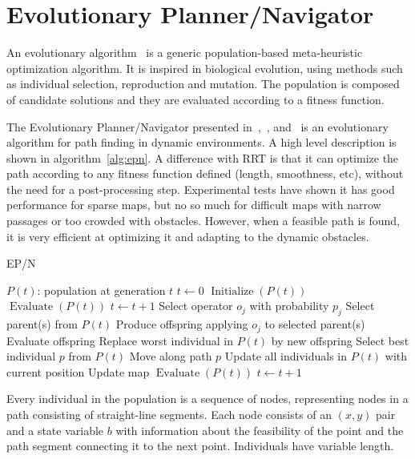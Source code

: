 \section{Evolutionary Planner/Navigator}
\label{sec:EP/N}
An evolutionary algorithm~\cite{Back97} is a generic population-based meta-heuristic
optimization algorithm. It is inspired in biological evolution, using methods
such as individual selection, reproduction and mutation. The population is
composed of candidate solutions and they are evaluated according to a fitness
function.

The Evolutionary Planner/Navigator presented in~\cite{Xiao96},~\cite{Xiao97}, and~
\cite{Trojanowski97} is an evolutionary
algorithm for path finding in dynamic environments. A high level description is
shown in algorithm~\ref{alg:epn}. A difference with RRT is
that it can optimize the path according to any fitness function
defined (length, smoothness, etc), without the need for a post-processing step.
Experimental tests have shown it has
good performance for sparse maps, but no so much for difficult maps with narrow
passages or too crowded with obstacles. However, when a feasible path is found,
it is very efficient at optimizing it and adapting to the dynamic obstacles.
\begin{algorithm}[ht!]
\caption{EP/N}
\label{alg:epn}
\begin{algorithmic}[1]
    \STATE \(P(t)\): population at generation \(t\)
    \STATE \(t \leftarrow 0\)
    \STATE \(\operatorname{Initialize}(P(t))\)
    \STATE \(\operatorname{Evaluate}(P(t))\)
        \STATE \(t \leftarrow t + 1\)
        \STATE Select operator $o_j$ with probability $p_j$
        \STATE Select parent(s) from $P(t)$
        \STATE Produce offspring applying $o_j$ to selected parent(s)
        \STATE Evaluate offspring
        \STATE Replace worst individual in $P(t)$ by new offspring
        \STATE Select best individual $p$ from $P(t)$
            \STATE Move along path \(p\)
            \STATE Update all individuals in \(P(t)\) with current position
                \STATE Update map
            \ENDIF
            \STATE \(\operatorname{Evaluate}(P(t))\)
        \ENDIF
        \STATE \(t \leftarrow t + 1\)
    \ENDWHILE
\end{algorithmic}
\end{algorithm}
Every individual in the population is a sequence of nodes, representing
nodes in a path consisting of straight-line segments. Each node consists of an
$(x,y)$ pair and a state variable $b$ with information about the feasibility of
the point and the path segment connecting it to the next point. Individuals have
variable length.

